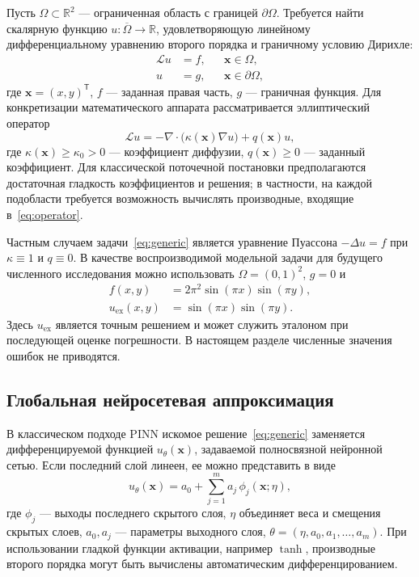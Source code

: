 \documentclass{misisarticle}
\begin{document}
Пусть $\Omega\subset\mathbb{R}^{2}$ --- ограниченная область с границей $\partial\Omega$. Требуется найти скалярную функцию $u:\overline{\Omega}\to\mathbb{R}$, удовлетворяющую линейному дифференциальному уравнению второго порядка и граничному условию Дирихле:
\begin{equation}
\begin{aligned}
\mathcal{L}u&=f, && \mathbf{x}\in\Omega,\\
 u&=g, && \mathbf{x}\in\partial\Omega,
\end{aligned}
\label{eq:generic}
\end{equation}
где $\mathbf{x}=(x,y)^{\mathsf T}$, $f$ --- заданная правая часть, $g$ --- граничная функция. Для конкретизации математического аппарата рассматривается эллиптический оператор
\begin{equation}
\mathcal{L}u=-\nabla\!\cdot\bigl(\kappa(\mathbf{x})\nabla u\bigr)
 +q(\mathbf{x})u,
\label{eq:operator}
\end{equation}
где $\kappa(\mathbf{x})\geq\kappa_{0}>0$ --- коэффициент диффузии, $q(\mathbf{x})\geq0$ --- заданный коэффициент. Для классической поточечной постановки предполагаются достаточная гладкость коэффициентов и решения; в частности, на каждой подобласти требуется возможность вычислять производные, входящие в~\eqref{eq:operator}.

Частным случаем задачи~\eqref{eq:generic} является уравнение Пуассона $-\Delta u=f$ при $\kappa\equiv1$ и $q\equiv0$. В качестве воспроизводимой модельной задачи для будущего численного исследования можно использовать $\Omega=(0,1)^2$, $g=0$ и
\begin{equation}
\begin{aligned}
 f(x,y)&=2\pi^2\sin(\pi x)\sin(\pi y),\\
 u_{\mathrm{ex}}(x,y)&=\sin(\pi x)\sin(\pi y).
\end{aligned}
\label{eq:poisson}
\end{equation}
Здесь $u_{\mathrm{ex}}$ является точным решением и может служить эталоном при последующей оценке погрешности. В настоящем разделе численные значения ошибок не приводятся.

\subsection{Глобальная нейросетевая аппроксимация}

В классическом подходе PINN искомое решение~\eqref{eq:generic} заменяется дифференцируемой функцией $u_{\theta}(\mathbf{x})$, задаваемой полносвязной нейронной сетью. Если последний слой линеен, ее можно представить в виде
\begin{equation}
 u_{\theta}(\mathbf{x})=a_{0}+\sum_{j=1}^{m}
 a_{j}\,\phi_{j}(\mathbf{x};\eta),
\label{eq:globalnet}
\end{equation}
где $\phi_j$ --- выходы последнего скрытого слоя, $\eta$ объединяет веса и смещения скрытых слоев, $a_0,a_j$ --- параметры выходного слоя, $\theta=(\eta,a_0,a_1,\ldots,a_m)$. При использовании гладкой функции активации, например $\tanh$, производные второго порядка могут быть вычислены автоматическим дифференцированием.
\end{document}
